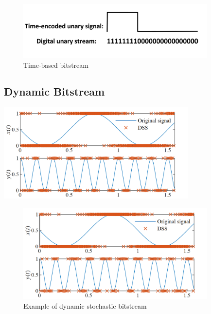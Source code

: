 \begin{figure}[htb]
	\includegraphics[width=10cm]{gfx/Time-encode signal.png}
	\caption{Time-based bitstream}
	\label{fig:system:example1}
\end{figure}

\subsection{Dynamic Bitstream}

\includegraphics[width=10cm]{gfx/DSC.png} 

\begin{figure}[htb]
	\includegraphics[width=10cm]{gfx/DSC.png} 
	\caption{Example of dynamic stochastic bitstream}
	\label{fig:system:example2}
\end{figure}


